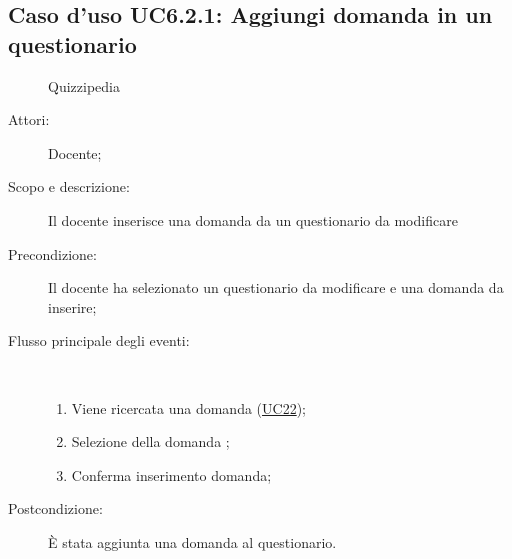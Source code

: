 \subsection{Caso d'uso UC6.2.1: Aggiungi domanda in un questionario}
	\begin{figure}[H]
		\centering
		\begin{resizedtikzpicture}{\textwidth}
		\begin{umlsystem}[x=0, fill=lightgray!20]{Quizzipedia}
		\end{umlsystem}
		\end{resizedtikzpicture}
		\caption{}
	\end{figure}
\begin{description}
\item[Attori:] Docente;
\item[Scopo e descrizione:] Il docente inserisce una domanda da un questionario da modificare
      \item[Precondizione:] Il docente ha selezionato un questionario da modificare e una domanda da inserire;

        \item[Flusso principale degli eventi:] \ 
 \begin{enumerate}
          \item Viene ricercata una domanda (\hyperlink{UC22}{UC22});
          \item Selezione della domanda	;
          \item Conferma inserimento domanda;

      \end{enumerate}
    \item[Postcondizione:] È stata aggiunta una domanda al questionario.
  \end{description}
\hypertarget{UC6.2.2}{}
